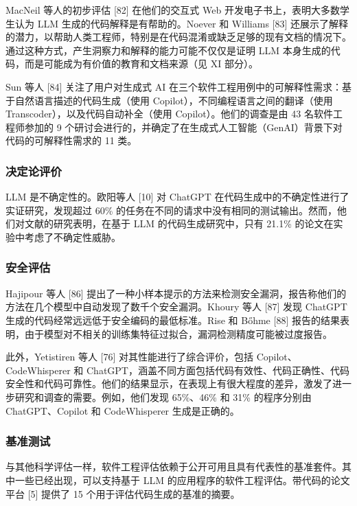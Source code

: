 \begin{translation}
MacNeil 等人的初步评估 [82] 在他们的交互式 Web 开发电子书上，表明大多数学生认为 LLM 生成的代码解释是有帮助的。Noever 和 Williams [83] 还展示了解释的潜力，以帮助人类工程师，特别是在代码混淆或缺乏足够的现有文档的情况下。通过这种方式，产生洞察力和解释的能力可能不仅仅是证明 LLM 本身生成的代码，而是可能成为有价值的教育和文档来源（见 XI 部分）。

Sun 等人 [84] 关注了用户对生成式 AI 在三个软件工程用例中的可解释性需求：基于自然语言描述的代码生成（使用 Copilot），不同编程语言之间的翻译（使用 Transcoder），以及代码自动补全（使用 Copilot）。他们的调查是由 43 名软件工程师参加的 9 个研讨会进行的，并确定了在生成式人工智能（GenAI）背景下对代码的可解释性需求的 11 类。

\subsubsection{决定论评价}

LLM 是不确定性的。欧阳等人 [10] 对 ChatGPT 在代码生成中的不确定性进行了实证研究，发现超过 60\% 的任务在不同的请求中没有相同的测试输出。然而，他们对文献的研究表明，在基于 LLM 的代码生成研究中，只有 21.1\% 的论文在实验中考虑了不确定性威胁。

\subsubsection{安全评估}

Hajipour 等人 [86] 提出了一种小样本提示的方法来检测安全漏洞，报告称他们的方法在几个模型中自动发现了数千个安全漏洞。Khoury 等人 [87] 发现 ChatGPT 生成的代码经常远远低于安全编码的最低标准。Rise 和 Bőhme [88] 报告的结果表明，由于模型对不相关的训练集特征过拟合，漏洞检测精度可能被过度报告。

此外，Yetistiren 等人 [76] 对其性能进行了综合评价，包括 Copilot、CodeWhisperer 和 ChatGPT，涵盖不同方面包括代码有效性、代码正确性、代码安全性和代码可靠性。他们的结果显示，在表现上有很大程度的差异，激发了进一步研究和调查的需要。例如，他们发现 65\%、46\% 和 31\% 的程序分别由 ChatGPT、Copilot 和 CodeWhisperer 生成是正确的。

\subsubsection{基准测试}

与其他科学评估一样，软件工程评估依赖于公开可用且具有代表性的基准套件。其中一些已经出现，可以支持基于 LLM 的应用程序的软件工程评估。带代码的论文平台 [5] 提供了 15 个用于评估代码生成的基准的摘要。


\end{translation}
